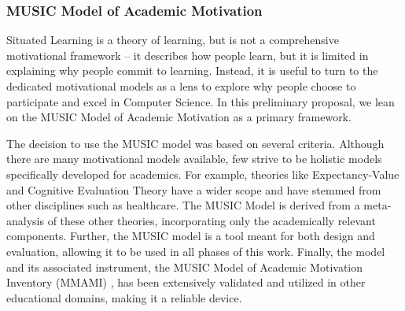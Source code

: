 
\subsubsection{MUSIC Model of Academic Motivation}

Situated Learning is a theory of learning, but is not a comprehensive motivational framework -- it describes how people learn, but it is limited in explaining why people commit to learning.
Instead, it is useful to turn to the dedicated motivational models as a lens to explore why people choose to participate and excel in Computer Science.
In this preliminary proposal, we lean on the MUSIC Model of Academic Motivation as a primary framework.

The decision to use the MUSIC model was based on several criteria.
Although there are many motivational models available, few strive to be holistic models specifically developed for academics.
For example, theories like Expectancy-Value and Cognitive Evaluation Theory have a wider scope and have stemmed from other disciplines such as healthcare.
The MUSIC Model is derived from a meta-analysis of these other theories, incorporating only the academically relevant components.
Further, the MUSIC model is a tool meant for both design and evaluation, allowing it to be used in all phases of this work.
Finally, the model and its associated instrument, the MUSIC Model of Academic Motivation Inventory (MMAMI) , has been extensively validated and utilized in other educational domains, making it a reliable device\cite{jones-validity}.


